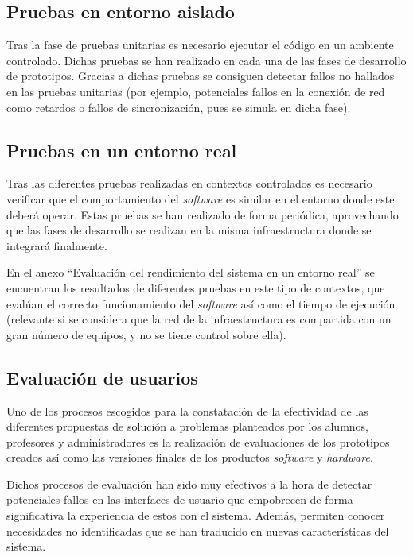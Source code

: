 \subsection{Pruebas en entorno aislado}

Tras la fase de pruebas unitarias es necesario ejecutar el código en un ambiente controlado. Dichas pruebas se han realizado en cada una de las fases de desarrollo de prototipos. Gracias a dichas pruebas se consiguen detectar fallos no hallados en las pruebas unitarias (por ejemplo, potenciales fallos en la conexión de red como retardos o fallos de sincronización, pues se simula en dicha fase).

\subsection{Pruebas en un entorno real}

Tras las diferentes pruebas realizadas en contextos controlados es necesario verificar que el comportamiento del \textit{software} es similar en el entorno donde este deberá operar. Estas pruebas se han realizado de forma periódica, aprovechando que las fases de desarrollo se realizan en la misma infraestructura donde se integrará finalmente.

En el anexo ``Evaluación del rendimiento del sistema en un entorno real'' se encuentran los resultados de diferentes pruebas en este tipo de contextos, que evalúan el correcto funcionamiento del \textit{software} así como el tiempo de ejecución (relevante si se considera que la red de la infraestructura es compartida con un gran número de equipos, y no se tiene control sobre ella).

\subsection{Evaluación de usuarios}

Uno de los procesos escogidos para la constatación de la efectividad de las diferentes propuestas de solución a problemas planteados por los alumnos, profesores y administradores es la realización de evaluaciones de los prototipos creados así como las versiones finales de los productos \textit{software} y \textit{hardware}.

Dichos procesos de evaluación han sido muy efectivos a la hora de detectar potenciales fallos en las interfaces de usuario que empobrecen de forma significativa la experiencia de estos con el sistema. Además, permiten conocer necesidades no identificadas que se han traducido en nuevas características del sistema.

